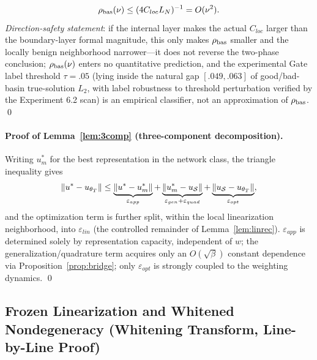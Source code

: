 \documentclass[11pt]{article}
\DeclarePairedDelimiter{\norm}{\lVert}{\rVert}
\numberwithin{equation}{section}
\begin{document}
\begin{equation}\label{eq:rhoscale}
\rho_{\rm bas}(\nu)\le(4C_{loc}L_N)^{-1}=O(\nu^{2}).
\end{equation}
\emph{Direction-safety statement}: if the internal layer makes the actual $C_{loc}$ larger than the boundary-layer formal magnitude, this only makes $\rho_{\rm bas}$ smaller and the locally benign neighborhood narrower---it does not reverse the two-phase conclusion; $\rho_{\rm bas}(\nu)$ enters no quantitative prediction, and the experimental Gate label threshold $\tau=.05$ (lying inside the natural gap $[.049,.063]$ of good/bad-basin true-solution $L_2$, with label robustness to threshold perturbation verified by the Experiment 6.2 scan) is an empirical classifier, not an approximation of $\rho_{\rm bas}$. \qed

\paragraph{Proof of Lemma~\ref{lem:3comp} (three-component decomposition).}
Writing $u_m^*$ for the best representation in the network class, the triangle inequality gives
\[
\norm{u^*-u_{\theta_T}}\le\underbrace{\norm{u^*-u_m^*}}_{\varepsilon_{app}}+\underbrace{\norm{u_m^*-u_{\mathcal S}}}_{\varepsilon_{gen}+\varepsilon_{quad}}+\underbrace{\norm{u_{\mathcal S}-u_{\theta_T}}}_{\varepsilon_{opt}},
\]
and the optimization term is further split, within the local linearization neighborhood, into $\varepsilon_{lin}$ (the controlled remainder of Lemma~\ref{lem:linrec}). $\varepsilon_{app}$ is determined solely by representation capacity, independent of $w$; the generalization/quadrature term acquires only an $O(\sqrt\beta)$ constant dependence via Proposition~\ref{prop:bridge}; only $\varepsilon_{opt}$ is strongly coupled to the weighting dynamics. \qed

\subsection{Frozen Linearization and Whitened Nondegeneracy (Whitening Transform, Line-by-Line Proof)}
\end{document}
